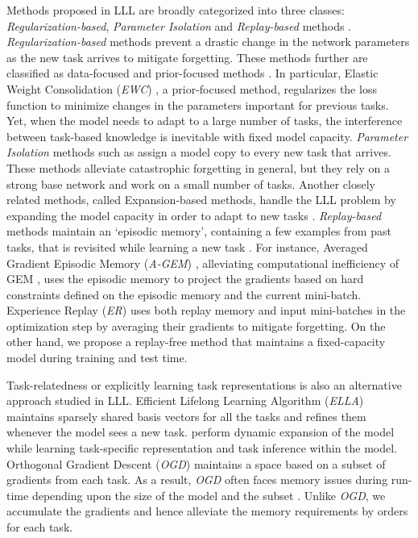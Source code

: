 \documentclass{article} \usepackage{collas2022_conference,times}
\begin{document}
    Methods proposed in LLL are broadly categorized into three classes: \textit{Regularization-based}, \textit{Parameter Isolation} and \textit{Replay-based} methods \citep{masana2020class,delange2021continual,mai2022online}. \textit{Regularization-based} methods prevent a drastic change in the network parameters as the new task arrives to mitigate forgetting. These methods further are classified as data-focused \citep{li2017learning,triki2017encoder,li2021lifelong} and prior-focused methods \citep{nguyen2018variational,ebrahimi2019uncertainty}. In particular, Elastic Weight Consolidation (\textit{EWC}) \citep{kirkpatrick2017overcoming}, a prior-focused method, regularizes the loss function to minimize changes in the parameters important for previous tasks. Yet, when the model needs to adapt to a large number of tasks, the interference between task-based knowledge is inevitable with fixed model capacity.
\textit{Parameter Isolation} methods \citep{rusu2016progressive,xu2018reinforced,serra2018overcoming} such as \citep{aljundi2017expert} assign a model copy to every new task that arrives. These methods alleviate catastrophic forgetting in general, but they rely on a strong base network and work on a small number of tasks. Another closely related methods, called Expansion-based methods, handle the LLL problem by expanding the model capacity in order to adapt to new tasks \citep{sodhani2018training,rao2019continual}. \textit{Replay-based} methods maintain an `episodic memory', containing a few examples from past tasks, that is revisited while learning a new task \citep{riemer2018learning,jin2020gradient}. For instance, Averaged Gradient Episodic Memory (\textit{A-GEM}) \citep{chaudhry2018efficient}, alleviating computational inefficiency of GEM \citep{lopez2017gradient}, uses the episodic memory to project the gradients based on hard constraints defined on the episodic memory and the current mini-batch. Experience Replay (\textit{ER}) \citep{chaudhry2019tiny} uses both replay memory and input mini-batches in the optimization step by averaging their gradients to mitigate forgetting. { On the other hand, we propose a replay-free method that maintains a fixed-capacity model during training and test time.} 

    Task-relatedness \citep{li2017learning,jerfel2019reconciling,shaker2020modular} or explicitly learning task representations \citep{yoon2017lifelong} is also an alternative approach studied in LLL. Efficient Lifelong Learning Algorithm (\textit{ELLA}) \citep{ruvolo2013ella} maintains sparsely shared basis vectors for all the tasks and refines them whenever the model sees a new task. \citet{rao2019continual} perform dynamic expansion of the model while learning task-specific representation and task inference within the model. Orthogonal Gradient Descent (\textit{OGD}) \citep{farajtabar2020orthogonal} maintains a space based on a subset of gradients from each task. As a result, \textit{OGD} often faces memory issues during run-time depending upon the size of the model and the subset \citep{bennani2020generalisation}. Unlike \textit{OGD}, we accumulate the gradients and hence alleviate the memory requirements by orders for each task. 
    
\end{document}
